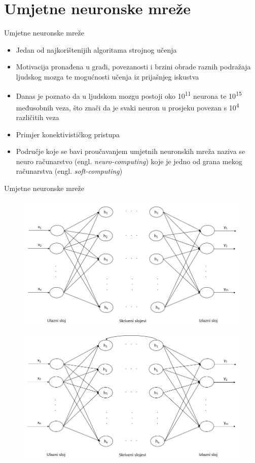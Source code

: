 \documentclass{beamer}
\begin{document}
\section{Umjetne neuronske mreže}
    \begin{frame}{Umjetne neuronske mreže}
        \begin{itemize}
            \item Jedan od najkorištenijih algoritama strojnog učenja
            \item Motivacija pronađena u građi, povezanosti i brzini obrade raznih podražaja ljudskog mozga te mogućnosti učenja iz prijašnjeg iskustva
            \item Danas je poznato da u ljudskom mozgu postoji oko 10\textsuperscript{11} neurona te 10\textsuperscript{15} međusobnih veza, što znači da je svaki neuron u prosjeku povezan s 10\textsuperscript{4} različitih veza
            \item Primjer konektivističkog pristupa
            \item Područje koje se bavi proučavanjem umjetnih neuronskih mreža naziva se neuro računarstvo (engl. \textit{neuro-computing}) koje je jedno od grana mekog računarstva (engl. \textit{soft-computing}) 
        \end{itemize}
    \end{frame}
    \begin{frame}{Umjetne neuronske mreže}
        \begin{figure}
            \includegraphics[scale=0.3]{img/ann.png}
        \end{figure}
        \begin{figure}
            \includegraphics[scale=0.3]{img/cycle-ann.png}
        \end{figure}
    \end{frame}
    
\end{document}

